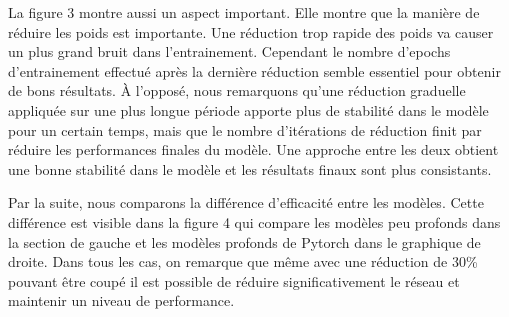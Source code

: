 \documentclass[12pt]{article}
\begin{document}
La figure 3 montre aussi un aspect important. Elle montre que la manière de réduire les poids est importante. Une réduction trop rapide des poids va causer un plus grand bruit dans l'entrainement. Cependant le nombre d'epochs d'entrainement effectué après la dernière réduction semble essentiel pour obtenir de bons résultats. À l'opposé, nous remarquons qu'une réduction graduelle appliquée sur une plus longue période apporte plus de stabilité dans le modèle pour un certain temps, mais que le nombre d'itérations de réduction finit par réduire les performances finales du modèle. Une approche entre les deux obtient une bonne stabilité dans le modèle et les résultats finaux sont plus consistants.


Par la suite, nous comparons la différence d’efficacité entre les modèles. Cette différence est visible dans la figure 4 qui compare les modèles peu profonds dans la section de gauche et les modèles profonds de Pytorch dans le graphique de droite. Dans tous les cas, on remarque que même avec une réduction de 30\% pouvant être coupé il est possible de réduire significativement le réseau et maintenir un niveau de performance.
\end{document}

